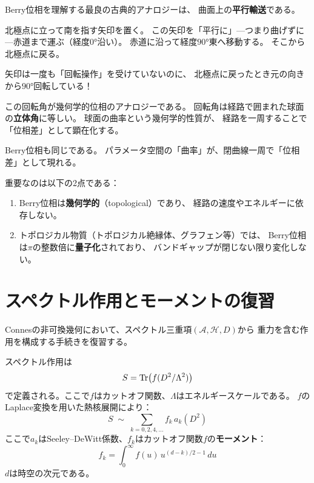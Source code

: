 Berry位相を理解する最良の古典的アナロジーは、
曲面上の\textbf{平行輸送}である。

\begin{hsbox}
北極点に立って南を指す矢印を置く。
この矢印を「平行に」---つまり曲げずに---赤道まで運ぶ（経度$0°$沿い）。
赤道に沿って経度$90°$東へ移動する。
そこから北極点に戻る。

矢印は一度も「回転操作」を受けていないのに、
北極点に戻ったとき元の向きから$90°$回転している！

この回転角が幾何学的位相のアナロジーである。
回転角は経路で囲まれた球面の\textbf{立体角}に等しい。
球面の曲率という幾何学的性質が、
経路を一周することで「位相差」として顕在化する。

Berry位相も同じである。
パラメータ空間の「曲率」が、閉曲線一周で「位相差」として現れる。
\end{hsbox}

\noindent
重要なのは以下の2点である：
\begin{enumerate}[label=(\roman*)]
\item Berry位相は\textbf{幾何学的}（topological）であり、
  経路の速度やエネルギーに依存しない。
\item トポロジカル物質（トポロジカル絶縁体、グラフェン等）では、
  Berry位相は$\pi$の整数倍に\textbf{量子化}されており、
  バンドギャップが閉じない限り変化しない。
\end{enumerate}


\section{スペクトル作用とモーメントの復習}
\label{sec:7.2}

Connesの非可換幾何において、スペクトル三重項$(\mathcal{A}, \mathcal{H}, D)$から
重力を含む作用を構成する手続きを復習する。

スペクトル作用は
\begin{equation}
S = \operatorname{Tr}\bigl(f(D^2/\Lambda^2)\bigr)
\end{equation}
で定義される。ここで$f$はカットオフ関数、$\Lambda$はエネルギースケールである。
$f$のLaplace変換を用いた熱核展開により：
\begin{equation}
S \;\sim\; \sum_{k=0,2,4,\ldots} f_k \, a_k(D^2)
\label{eq:spectral-action-expansion}
\end{equation}
ここで$a_k$はSeeley--DeWitt係数、$f_k$はカットオフ関数$f$の\textbf{モーメント}：
\begin{equation}
f_k = \int_0^\infty f(u)\, u^{(d-k)/2 - 1}\, du
\label{eq:moment-def}
\end{equation}
$d$は時空の次元である。

